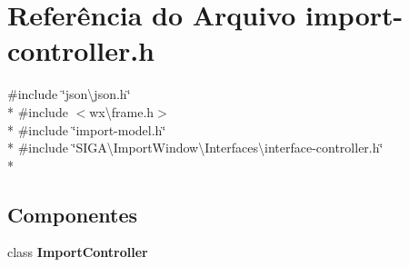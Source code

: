 \section{Referência do Arquivo import-\/controller.h}
\label{import-controller_8h}
{\ttfamily \#include \char`\"{}json\textbackslash{}json.\+h\char`\"{}}\\*
{\ttfamily \#include $<$wx\textbackslash{}frame.\+h$>$}\\*
{\ttfamily \#include \char`\"{}import-\/model.\+h\char`\"{}}\\*
{\ttfamily \#include \char`\"{}S\+I\+G\+A\textbackslash{}\+Import\+Window\textbackslash{}\+Interfaces\textbackslash{}interface-\/controller.\+h\char`\"{}}\\*
\subsection*{Componentes}
\begin{DoxyCompactItemize}
\item 
class {\bf Import\+Controller}
\end{DoxyCompactItemize}
